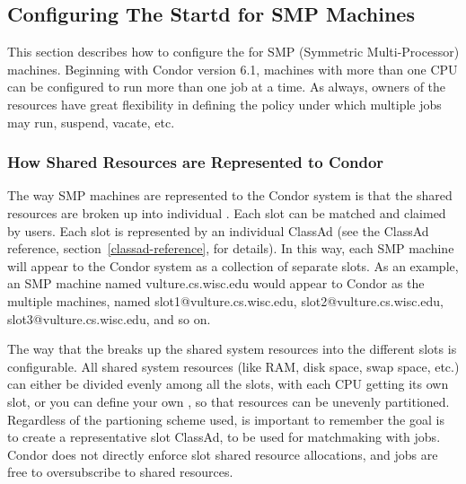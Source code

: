 \subsection{\label{sec:Configuring-SMP}
Configuring The Startd for SMP Machines}

This section describes how to configure the  for SMP
(Symmetric Multi-Processor) machines.
Beginning with Condor version 6.1, machines with more than one CPU can
be configured to run more than one job at a time.
As always, owners of the resources have great flexibility in defining
the policy under which multiple jobs may run, suspend, vacate, etc.  

\subsubsection{\label{sec:How-Resources-Represented}
How Shared Resources are Represented to Condor}

The way SMP machines are represented to the Condor system is that
the shared resources are broken up into individual .
Each slot can be matched and claimed by users.
Each slot is represented by an individual ClassAd
(see the ClassAd reference, section~\ref{classad-reference}, for
details). 
In this way, each SMP machine will appear to the Condor system as
a collection of separate slots.  
As an example, an SMP machine named
vulture.cs.wisc.edu would appear to Condor as the
multiple machines, named slot1@vulture.cs.wisc.edu,
slot2@vulture.cs.wisc.edu,
slot3@vulture.cs.wisc.edu, and so on.

The way that the  breaks up the
shared system resources into the different slots
is configurable.
All shared system resources (like RAM, disk space, swap space, etc.)
can either be divided evenly among all the slots, with each
CPU getting its own slot, or you can define your own
, so that resources can be unevenly
partitioned.  Regardless of the partioning scheme used, is important
to remember the goal is to create a representative slot
ClassAd, to be used for matchmaking with jobs.  Condor does not
directly enforce slot shared resource allocations, and jobs
are free to oversubscribe to shared resources.

